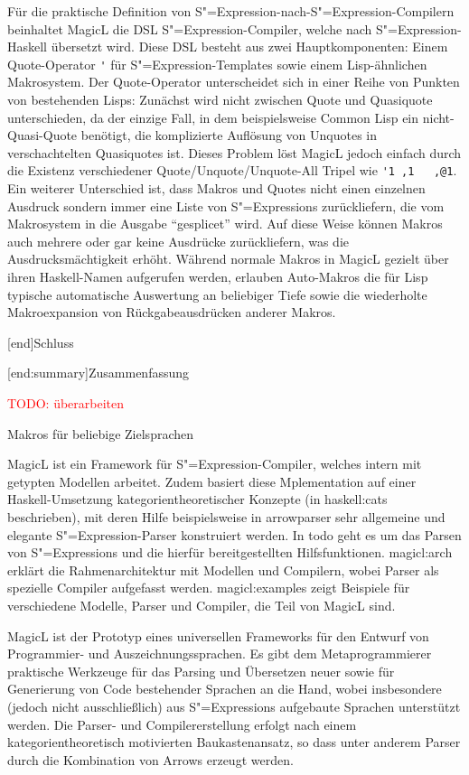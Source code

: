\documentclass[11pt, a4paper, bibgerm]{scrbook}
\newcommand\icode[1]{\lstinline?#1?}
\newcommand{\todo}[1]{
  \textcolor{red}{TODO: #1}
}
\newcommand\lchapter{}
\newcommand\lsection{}
\newcommand\sref{}
\newcommand{\sexp}{S"=Expression}
\newcommand{\sexps}{S"=Expressions}
\begin{document}
Für die praktische Definition von \sexp{}-nach-\sexp{}-Compilern
beinhaltet MagicL die DSL \sexp{}-Compiler, welche nach \sexp{}-Haskell
übersetzt wird. Diese DSL besteht aus zwei Hauptkomponenten: Einem
Quote-Operator \icode{'} für \sexp{}-Templates sowie einem
Lisp-ähnlichen Makrosystem. Der Quote-Operator unterscheidet sich in
einer Reihe von Punkten von bestehenden Lisps: Zunächst wird nicht
zwischen Quote und Quasiquote unterschieden, da der einzige Fall, in dem
beispielsweise Common Lisp ein nicht-Quasi-Quote benötigt, die
komplizierte Auflösung von Unquotes in verschachtelten Quasiquotes
ist. Dieses Problem löst MagicL jedoch einfach durch die Existenz
verschiedener Quote/Unquote/Unquote-All Tripel wie \icode{'1 ,1
  ,@1}. Ein weiterer Unterschied ist, dass Makros und Quotes nicht einen
einzelnen Ausdruck sondern immer eine Liste von \sexps{} zurückliefern,
die vom Makrosystem in die Ausgabe ``gesplicet'' wird. Auf diese Weise
können Makros auch mehrere oder gar keine Ausdrücke zurückliefern, was
die Ausdrucksmächtigkeit erhöht. Während normale Makros in MagicL
gezielt über ihren Haskell-Namen aufgerufen werden, erlauben Auto-Makros
die für Lisp typische automatische Auswertung an beliebiger Tiefe sowie
die wiederholte Makroexpansion von Rückgabeausdrücken anderer Makros.

\lchapter[end]{Schluss}

\lsection[end:summary]{Zusammenfassung}

\todo{überarbeiten}

Makros für beliebige Zielsprachen

MagicL ist ein Framework für \sexp-Compiler, welches
{} intern mit getypten Modellen arbeitet. Zudem basiert diese
Mplementation auf einer Haskell-Umsetzung kategorientheoretischer
Konzepte (in \sref{haskell:cats} beschrieben), mit deren Hilfe
beispielsweise in \sref{arrowparser} sehr allgemeine und elegante
\sexp{}-Parser konstruiert werden. In \sref{todo} geht es um
das Parsen von \sexps{} und die hierfür bereitgestellten
Hilfsfunktionen. \sref{magicl:arch} erklärt die Rahmenarchitektur mit
Modellen und Compilern, wobei Parser als spezielle Compiler aufgefasst
werden. \sref{magicl:examples} zeigt Beispiele für verschiedene
Modelle, Parser und Compiler, die Teil von MagicL sind.


MagicL ist der Prototyp eines
universellen Frameworks für den Entwurf von Programmier- und
Auszeichnungssprachen. Es gibt dem Metaprogrammierer praktische
Werkzeuge für das Parsing und Übersetzen neuer sowie für Generierung von
Code bestehender Sprachen an die Hand, wobei insbesondere (jedoch
nicht ausschließlich) aus \sexps{} aufgebaute Sprachen unterstützt
werden. Die Parser- und Compilererstellung erfolgt nach einem
kategorientheoretisch motivierten Baukastenansatz, so dass
unter anderem Parser durch die Kombination von Arrows erzeugt werden.
\end{document}
